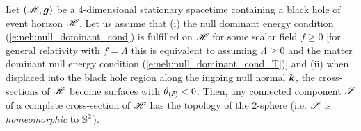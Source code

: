 \begin{prop}
\label{p:sta:topology1}
Let $(\mathscr{M}, \bm{g})$ be a 4-dimensional stationary spacetime
containing a black hole of event horizon $\mathscr{H}$.
Let us assume that
(i) the null dominant energy condition (\ref{e:neh:null_dominant_cond})
is fulfilled on $\mathscr{H}$ for some scalar field $f \geq 0$
[for general relativity with $f=\Lambda$
this is equivalent to assuming $\Lambda \geq 0$ and
the matter dominant null energy condition (\ref{e:neh:null_dominant_cond_T})]
and (ii) when
displaced into the black hole region along the ingoing null normal $\bm{k}$, the
cross-sections of $\mathscr{H}$ become surfaces with $\theta_{(\bm{\ell})} < 0$.
Then, any connected component $\mathscr{S}$ of a complete cross-section of $\mathscr{H}$
has the topology of the 2-sphere (i.e. $\mathscr{S}$ is
\emph{homeomorphic} to $\mathbb{S}^2$).
\end{prop}
